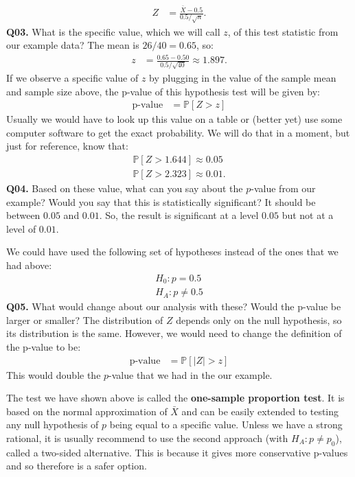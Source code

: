 \documentclass[12pt]{article}
\newcommand{\Prob}{\mathbb{P}}
\newcommand{\cblack}{\color{Black}}
\newcommand{\cblue}{\color{MidnightBlue}}
\begin{document}
\begin{align*}
Z &= \frac{\bar{X} - 0.5}{0.5 / \sqrt{n}}.
\end{align*}
\cblack \textbf{Q03.} What is the specific value, which we will call $z$, of this test statistic
from our example data? \cblue The mean is $26/40 = 0.65$, so:
\begin{align*}
z &= \frac{0.65 - 0.50}{0.5 / \sqrt{40}} \approx 1.897.
\end{align*}
\cblack If we observe a specific value of $z$ by plugging in the value of the
sample mean and sample size above, the p-value of this hypothesis test will be
given by:
\begin{align*}
\text{p-value} &= \Prob \left[Z > z \right]
\end{align*}
Usually we would have to look up this value on a table or (better yet) use some
computer software to get the exact probability. We will do that in a moment, but
just for reference, know that:
\begin{align*}
\Prob \left[Z > 1.644 \right] \approx 0.05 \\
\Prob \left[Z > 2.323 \right] \approx 0.01.
\end{align*}
\textbf{Q04.} Based on these value, what can you say about the $p$-value from our
example? Would you say that this is statistically significant? \cblue It should be
between $0.05$ and $0.01$. So, the result is significant at a level $0.05$ but not
at a level of $0.01$. \cblack

We could have used the following set of hypotheses instead of the ones that we had
above:
\begin{align*}
H_0: p = 0.5 \\
H_A: p \neq 0.5
\end{align*}
\textbf{Q05.} What would change about our analysis with these? Would the p-value
be larger or smaller? \cblue The distribution of $Z$ depends only on the null hypothesis,
so its distribution is the same. However, we would need to change the definition of
the p-value to be:
\begin{align*}
\text{p-value} &= \Prob \left[|Z| > z \right]
\end{align*}
This would double the $p$-value that we had in the our example. \cblack

The test we have shown above is called the \textbf{one-sample proportion test}. It
is based on the normal approximation of $\bar{X}$ and can be easily extended to testing 
any null hypothesis of $p$ being equal to a specific value. Unless we have a strong
rational, it is usually recommend to use the second approach (with $H_A: p \neq p_0$),
called a two-sided alternative. This is because it gives more conservative p-values
and so therefore is a safer option.
\end{document}
